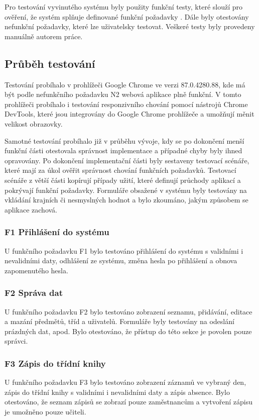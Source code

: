 Pro testování vyvinutého systému byly použity funkční testy, které slouží pro ověření, že systém splňuje definované funkční požadavky \cite{what-is-sw-testing}. Dále byly otestovány nefunkční požadavky, které lze uživatelsky testovat. Veškeré testy byly provedeny manuálně autorem práce.

\subsection{Průběh testování}
Testování probíhalo v prohlížeči Google Chrome ve verzi 87.0.4280.88, kde má být podle nefunkčního požadavku N2 webová aplikace plně funkční. V tomto prohlížeči probíhalo i testování responzivního chování pomocí nástrojů Chrome DevTools, které jsou integrovány do Google Chrome prohlížeče a umožňují měnit velikost obrazovky.

Samotné testování probíhalo již v průběhu vývoje, kdy se po dokončení menší funkční části otestovala správnost implementace a případné chyby byly ihned opravovány. Po dokončení implementační části byly sestaveny testovací scénáře, které mají za úkol ověřit správnost chování funkčních požadavků. Testovací scénáře z větší části kopírují případy užití, které definují průchody aplikací a pokrývají funkční požadavky. Formuláře obsažené v systému byly testovány na vkládání krajních či nesmyslných hodnot a bylo zkoumáno, jakým způsobem se aplikace zachová.

\subsubsection*{F1 Přihlášení do systému}
U funkčního požadavku F1 bylo testováno přihlášení do systému s validními i nevalidními daty, odhlášení ze systému, změna hesla po přihlášení a obnova zapomenutého hesla.

\subsubsection*{F2 Správa dat}
U funkčního požadavku F2 bylo testováno zobrazení seznamu, přidávání, editace a mazání předmětů, tříd a uživatelů. Formuláře byly testovány na odeslání prázdných dat, apod. Bylo otestováno, že přístup do této sekce je povolen pouze správci.

\subsubsection*{F3 Zápis do třídní knihy}
U funkčního požadavku F3 bylo testováno zobrazení záznamů ve vybraný den, zápis do třídní knihy s validními i nevalidními daty a zápis absence. Bylo otestováno, že seznam zápisů se zobrazí pouze zaměstnancům a vytvoření zápisu je umožněno pouze učiteli.

